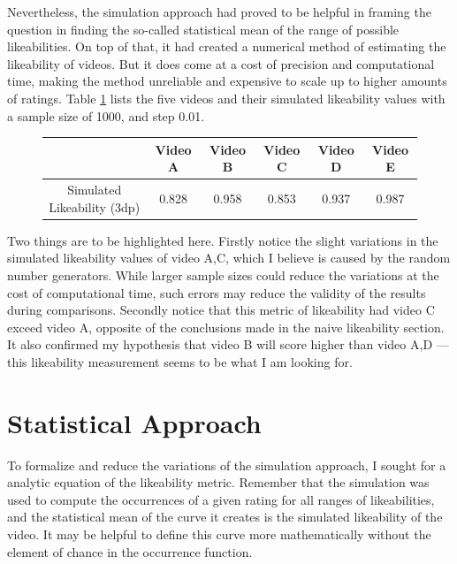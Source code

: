 \documentclass[a4paper,11pt]{article}
\begin{document}
Nevertheless, the simulation approach had proved to be helpful in framing the question in finding the so-called statistical mean of the range of possible likeabilities. On top of that, it had created a numerical method of estimating the likeability of videos. But it does come at a cost of precision and computational time, making the method unreliable and expensive to scale up to higher amounts of ratings. Table \ref{tbl:simulation} lists the five videos and their simulated likeability values with a sample size of 1000, and step 0.01.

\begin{figure}[H]
    \centering
    \begin{tabular}{c|c|c|c|c|c}
        & Video A & Video B & Video C & Video D & Video E \\
        \hline
        \hline
        Simulated Likeability (3dp) & 0.828 & 0.958 &  0.853 & 0.937 & 0.987
    \end{tabular}
    \label{tbl:simulation}
\end{figure}

Two things are to be highlighted here. Firstly notice the slight variations in the simulated likeability values of video A,C, which I believe is caused by the random number generators. While larger sample sizes could reduce the variations at the cost of computational time, such errors may reduce the validity of the results during comparisons. Secondly notice that this metric of likeability had video C exceed video A, opposite of the conclusions made in the naive likeability section. It also confirmed my hypothesis that video B will score higher than video A,D --- this likeability measurement seems to be what I am looking for.

\section{Statistical Approach}

To formalize and reduce the variations of the simulation approach, I sought for a analytic equation of the likeability metric. Remember that the simulation was used to compute the occurrences of a given rating for all ranges of likeabilities, and the statistical mean of the curve it creates is the simulated likeability of the video. It may be helpful to define this curve more mathematically without the element of chance in the occurrence function.

\end{document}
